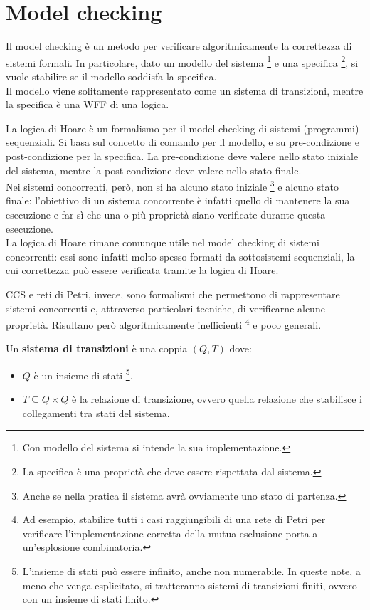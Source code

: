 \chapter{Model checking}
\sub
Il model checking è un metodo per verificare algoritmicamente la correttezza di sistemi formali. In particolare, dato un modello del sistema \footnote{Con modello del sistema si intende la sua implementazione.} e una specifica \footnote{La specifica è una proprietà che deve essere rispettata dal sistema.}, si vuole stabilire se il modello soddisfa la specifica.\\
Il modello viene solitamente rappresentato come un sistema di transizioni, mentre la specifica è una WFF di una logica.

La logica di Hoare è un formalismo per il model checking di sistemi (programmi) sequenziali. Si basa sul concetto di comando per il modello, e su pre-condizione e post-condizione per la specifica. La pre-condizione deve valere nello stato iniziale del sistema, mentre la post-condizione deve valere nello stato finale.\\
Nei sistemi concorrenti, però, non si ha alcuno stato iniziale \footnote{Anche se nella pratica il sistema avrà ovviamente uno stato di partenza.} e alcuno stato finale: l'obiettivo di un sistema concorrente è infatti quello di mantenere la sua esecuzione e far sì che una o più proprietà siano verificate durante questa esecuzione.\\
La logica di Hoare rimane comunque utile nel model checking di sistemi concorrenti: essi sono infatti molto spesso formati da sottosistemi sequenziali, la cui correttezza può essere verificata tramite la logica di Hoare.

CCS e reti di Petri, invece, sono formalismi che permettono di rappresentare sistemi concorrenti e, attraverso particolari tecniche, di verificarne alcune proprietà. Risultano però algoritmicamente inefficienti \footnote{Ad esempio, stabilire tutti i casi raggiungibili di una rete di Petri per verificare l'implementazione corretta della mutua esclusione porta a un'esplosione combinatoria.} e poco generali.

\begin{defn}
    Un \textbf{sistema di transizioni} è una coppia $(Q, T)$ dove:
    \begin{itemize}
        \item $Q$ è un insieme di stati \footnote[][1cm]{L'insieme di stati può essere infinito, anche non numerabile. In queste note, a meno che venga esplicitato, si tratteranno sistemi di transizioni finiti, ovvero con un insieme di stati finito.}.
        \item $T \subseteq Q \times Q$ è la relazione di transizione, ovvero quella relazione che stabilisce i collegamenti tra stati del sistema.
    \end{itemize}
\end{defn}

